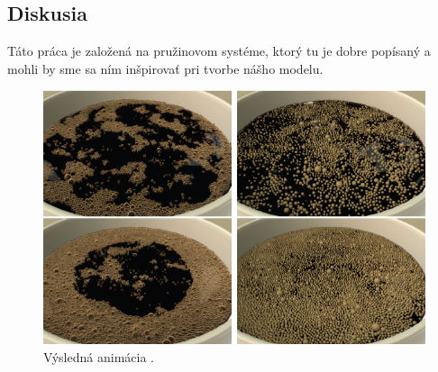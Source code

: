 \subsection{Diskusia}

Táto práca je založená na pružinovom systéme, ktorý tu je dobre popísaný a mohli by sme sa ním inšpirovať pri tvorbe nášho modelu.
\begin{figure}[H]
	\begin{center}
		\includegraphics[height=\imageHeight]{images/busaryev/results}
		\caption{Výsledná animácia \cite{busaryev2012}.}
	\end{center}
\end{figure}